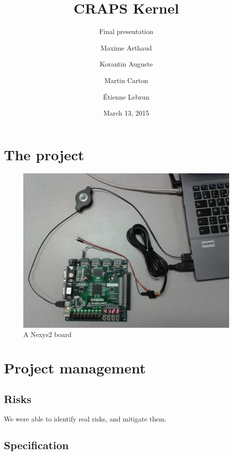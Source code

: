 \documentclass{beamer}
\title{CRAPS Kernel}
\subtitle{Final presentation}
\author{
       Maxime Arthaud
  \and Korantin Auguste
  \and Martin Carton
  \and Étienne Lebrun
}
\date{March 13, 2015}
\begin{document}
  \begin{frame}
    \titlepage%
  \end{frame}

  \section{The project}

    \begin{frame}
      \begin{figure}
        \centering
        \includegraphics[width=\textwidth, keepaspectratio]{fig/Nexys2.jpg}
        \caption{A Nexys2 board}
      \end{figure}
    \end{frame}

  \section{Project management}

    \subsection{Risks}

    \begin{frame}
      We were able to identify real risks, and mitigate them.
    \end{frame}

    \subsection{Specification}
\end{document}
